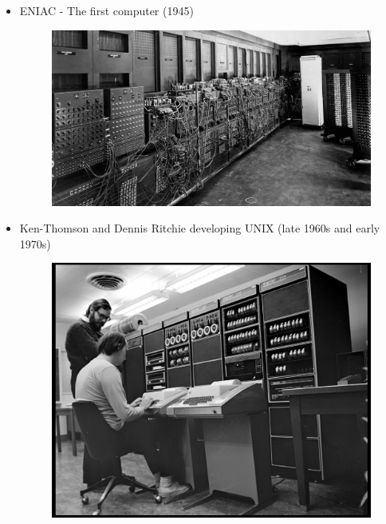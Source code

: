 \documentclass[12pt]{article}
\begin{document}
\begin{itemize}
    \item ENIAC - The first computer (1945)
    \begin{figure}[H]
        \centering
        \captionsetup{labelformat=empty}
        \includegraphics[width=420px]{images/ENIAC.png}
        \label{fig:enter-label}
    \end{figure}

    \item Ken-Thomson and Dennis Ritchie developing UNIX (late 1960s and early 1970s)
    \begin{figure}[H]
        \centering
        \captionsetup{labelformat=empty}
        \includegraphics[width=420px]{images/Ken_Dennis.png}
        \label{fig:enter-label}
    \end{figure}


\end{itemize}
\end{document}

